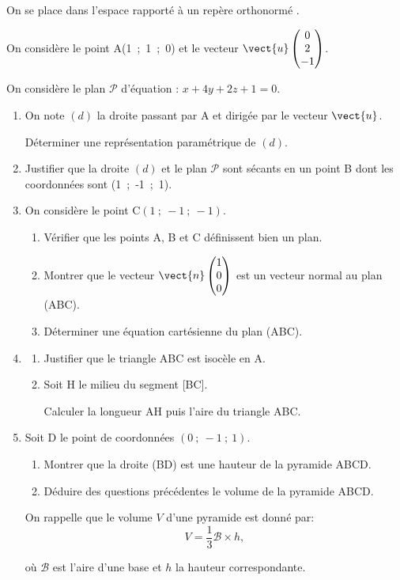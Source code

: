\medskip

On se place dans l'espace rapporté à un repère orthonormé \Oijk.

On considère le point A(1~;~1~;~0) et le vecteur $\vect{u}\begin{pmatrix}0\\2\\- 1\end{pmatrix}$.

On considère le plan $\mathcal{P}$ d'équation : $x + 4y + 2z + 1 = 0$.

\medskip

\begin{enumerate}
\item On note $(d)$ la droite passant par A et dirigée par le vecteur $\vect{u}$.

Déterminer une représentation paramétrique de $(d)$.
\item Justifier que la droite $(d)$ et le plan $\mathcal{P}$ sont sécants en un point B dont les coordonnées sont (1~;~-1~;~1).
\item On considère le point C$(1~;~-1~;~-1)$.
	\begin{enumerate}
		\item Vérifier que les points A, B et C définissent bien un plan.
		\item Montrer que le vecteur $\vect{n}\begin{pmatrix}1\\0\\0\end{pmatrix}$ est un vecteur normal au plan (ABC).
		\item Déterminer une équation cartésienne du plan (ABC).
	\end{enumerate}
\item 
	\begin{enumerate}
		\item Justifier que le triangle ABC est isocèle en A.
		\item Soit H le milieu du segment [BC].
		
Calculer la longueur AH puis l'aire du triangle ABC.
	\end{enumerate}
\item Soit D le point de coordonnées $(0~;~-1~;~1)$.
	\begin{enumerate}
		\item Montrer que la droite (BD) est une hauteur de la pyramide ABCD.
		\item Déduire des questions précédentes le volume de la pyramide ABCD.
	\end{enumerate}
	
\begin{center}On rappelle que le volume $V$ d'une pyramide est donné par:
	\[V = \dfrac13 \mathcal{B} \times h,\]

où $\mathcal{B}$ est l'aire d'une base et $h$ la hauteur correspondante.\end{center}
\end{enumerate}

\bigskip
